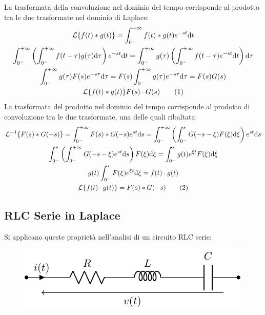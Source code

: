 \documentclass{article}
\newcommand{\df}{\mathrm{d}}
\newcommand{\tageq}{\tag{\stepcounter{equation}\theequation}}
\numberwithin{equation}{subsection}
\begin{document}
La trasformata della convoluzione nel dominio del tempo corrisponde al prodotto tra le due trasformate nel dominio di Laplace:
\begin{gather*}
    \mathcal{L}\{f(t)* g(t)\}=\displaystyle\int_{0^-}^{+\infty}f(t)*g(t)e^{-st}\df t\\
    \displaystyle\int_{0^-}^{+\infty}\left(\int_{0^-}^{+\infty}f(t-\tau)g(\tau)\df\tau\right)e^{-st}\df t=\int_{0^-}^{+\infty}g(\tau)\left(\int_{0^-}^{+\infty}f(t-\tau)e^{-st}\df t\right)\df\tau\\
    \displaystyle\int_{0^-}^{+\infty}g(\tau)F(s)e^{-s\tau}\df\tau=F(s)\int_{0^-}^{+\infty}g(\tau)e^{-s\tau}\df\tau=F(s)G(s)\\
    \mathcal{L}\{f(t)*g(t)\}F(s)\cdot G(s)\tageq
\end{gather*}
La trasformata del prodotto nel dominio del tempo corrisponde al prodotto di convoluzione tra le due trasformate, una delle quali ribaltata:
\begin{gather*}
    \mathcal{L}^{-1}\{F(s)*G(-s)\}=\displaystyle\int_{0^-}^{+\infty}F(s)*G(-s)e^{st}\df s=\int_{0^-}^{+\infty}\left(\int_{0^-}^sG(-s-\xi)F(\xi)\df\xi\right)e^{st}\df s\\
    \displaystyle\int_{0^-}^{s}\left(\int_{0^-}^{+\infty}G(-s-\xi)e^{st}\df s\right)F(\xi)\df\xi=\int_{0^-}^sg(t)e^{\xi t}F(\xi)\df\xi\\
    g(t)\displaystyle\int_{0^-}^{s}F(\xi)e^{\xi t}\df\xi=f(t)\cdot g(t)\\
    \mathcal{L}\{f(t)\cdot g(t)\}=F(s)*G(-s)\tageq
\end{gather*}

\subsection{RLC Serie in Laplace}

Si applicano queste proprietà nell'analisi di un circuito RLC serie:
\begin{figure}[H]%
    \centering
    \includegraphics{serie-circuito-rlc-serie.pdf}%
    \label{fig:serie-circuito-rlc-serie}
\end{figure}
\end{document}
